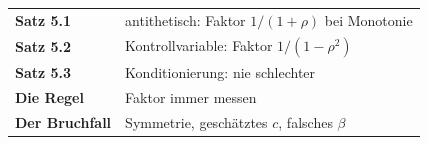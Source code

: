\begin{merksatz}
\begin{center}
\renewcommand{\arraystretch}{1.5}
\begin{tabular}{@{}P{3.0cm}P{5.6cm}@{}}
\toprule
\textbf{Satz 5.1} & antithetisch: Faktor $1/(1+\rho)$ bei Monotonie\\
\textbf{Satz 5.2} & Kontrollvariable: Faktor $1/(1-\rho^2)$\\
\textbf{Satz 5.3} & Konditionierung: nie schlechter\\
\textbf{Die Regel} & Faktor immer messen\\
\textbf{Der Bruchfall} & Symmetrie, geschätztes $c$, falsches $\beta$\\
\bottomrule
\end{tabular}
\end{center}

\begin{center}
\begin{minipage}{0.88\textwidth}
\end{minipage}
\end{center}
\end{merksatz}
